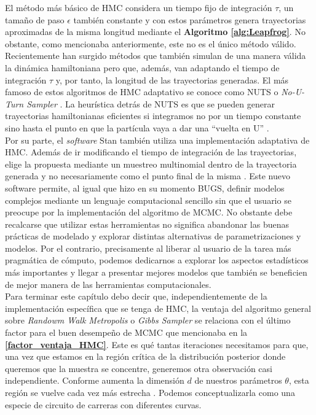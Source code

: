 El método más básico de HMC considera un tiempo fijo de integración $\tau$, un tamaño de paso $\epsilon$ también constante y con estos parámetros genera  trayectorias aproximadas de la misma longitud mediante el \textbf{Algoritmo \ref{alg:Leapfrog}}. No obstante, como mencionaba anteriormente, este no es el único método válido. Recientemente han surgido métodos que también simulan de una manera válida la dinámica hamiltoniana pero que, además, van adaptando el tiempo de integración $\tau$ y, por tanto, la longitud de las trayectorias generadas. El más famoso de estos algoritmos de HMC adaptativo se conoce como NUTS o \textit{No-U-Turn Sampler} \parencite{NUTS11}. La heurística detrás de NUTS es que se pueden generar trayectorias hamiltonianas eficientes si integramos no por un tiempo constante sino hasta el punto en que la partícula vaya a dar una ``vuelta en U'' \parencite{Betancourt17,McElreath17}.\\

Por su parte, el \textit{software} Stan también utiliza una implementación adaptativa de HMC. Además de ir modificando el tiempo de integración de las trayectorias, elige la propuesta mediante un muestreo multinomial dentro de la trayectoria generada y no necesariamente como el punto final de la misma \parencite{Betancourt16,TuitSimpson18}. Este nuevo software permite, al igual que hizo en su momento BUGS, definir modelos complejos mediante un lenguaje computacional sencillo sin que el usuario se preocupe por la implementación del algoritmo de MCMC. No obstante debe recalcarse que utilizar estas herramientas no significa abandonar las buenas prácticas de modelado y explorar distintas alternativas de parametrizaciones y modelos. Por el contrario, precisamente al liberar al usuario de la tarea más pragmática de cómputo, podemos dedicarnos a explorar los aspectos estadísticos más importantes y llegar a presentar mejores modelos que también se beneficien de mejor manera de las herramientas computacionales.\\

Para terminar este capítulo debo decir que, independientemente de la implementación específica que se tenga de HMC, la ventaja del algoritmo general sobre \textit{Randowm Walk Metropolis} o \textit{Gibbs Sampler} se relaciona con el último factor para el buen desempeño de MCMC que mencionaba en la \textbf{\autoref{factor_ventaja_HMC}}. Este es qué tantas iteraciones necesitamos para que, una vez que estamos en la región crítica de la distribución posterior donde queremos que la muestra se concentre, generemos otra observación casi independiente. Conforme aumenta la dimensión $d$ de nuestros parámetros $\theta$, esta región se vuelve cada vez más estrecha \parencites{Betancourt17,McElreath17}. Podemos conceptualizarla como una especie de circuito de carreras con diferentes curvas.\\ 


